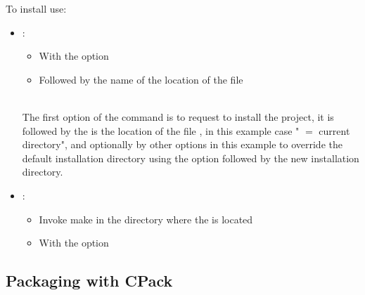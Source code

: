 To install use:
\begin{itemize}
\item {}:
\begin{itemize}
\item With the  option
\item Followed by the name of the location of the file 
\end{itemize}
\vspace{-1cm}
{\footnotesize{
\begin{scripti}
      
\end{scripti}
}}\\[-0.75cm]
\noindent The first option of the command is to request to install the project, it is followed by the is the location of the file , in this example case " $=$ current directory", and optionally by other options in this example to override the default installation directory using the  option followed by the new installation directory. 
\newpage
\item {}:
\begin{itemize}
\item Invoke make in the directory where the  is located
\item With the  option
\end{itemize}
\vspace{-0.75cm}
\begin{scripti}
   
\end{scripti} 
\end{itemize}
\subsection{Packaging with CPack}


